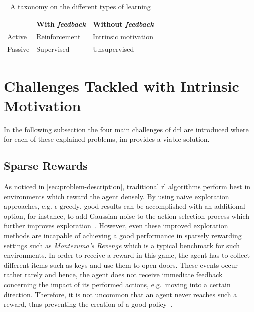 \documentclass[draft,final]{vutinfth} %
\newcommand{\p}[1]{see p. #1}
\begin{document}
    \begin{table}
        \centering
        \begin{tabular}{|l|l|l|}
            \hline
            & With \textit{feedback} & Without \textit{feedback} \\
            \hline
            Active  & Reinforcement          & Intrinsic motivation      \\
            \hline
            Passive & Supervised             & Unsupervised              \\
            \hline
        \end{tabular}
        \caption[A taxonomy on the different types of learning]{A taxonomy on the different types of learning\protect\footnotemark}
        \label{tab:type_learning}
    \end{table}

    \footnotetext{\citep[\p{4}]{aubret_survey_2019}}


    \section{Challenges Tackled with Intrinsic Motivation}

    In the following subsection the four main challenges of \gls{drl} are introduced where for each of these explained problems, \gls{im} provides a viable solution.

    \subsection{Sparse Rewards}\label{subsec:sparse-rewards}

    As noticed in \autoref{sec:problem-description}, traditional \gls{rl} algorithms perform best in environments which reward the agent densely.
    By using naive exploration approaches, e.g. $\epsilon\text{-greedy}$, good results can be accomplished with an additional option, for instance, to add Gaussian noise to the action selection process which further improves exploration~\citep{lillicrap_continuous_2019}.
    However, even these improved exploration methods are incapable of achieving a good performance in sparsely rewarding settings such as \textit{Montezuma's Revenge} which is a typical benchmark for such environments.
    In order to receive a reward in this game, the agent has to collect different items such as keys and use them to open doors.
    These events occur rather rarely and hence, the agent does not receive immediate feedback concerning the impact of its performed actions, e.g.\ moving into a certain direction.
    Therefore, it is not uncommon that an agent never reaches such a reward, thus preventing the creation of a good policy~\citep{aubret_survey_2019}.
\end{document}
